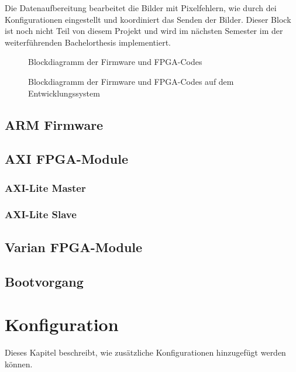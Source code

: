 \documentclass{article}
\begin{document}
Die Datenaufbereitung bearbeitet die Bilder mit Pixelfehlern, wie durch dei Konfigurationen eingestellt und koordiniert das Senden der Bilder. Dieser Block ist noch nicht Teil von diesem Projekt und wird im nächsten Semester im der weiterführenden Bachelorthesis implementiert.

\begin{figure}[tb]
    \caption{Blockdiagramm der Firmware und FPGA-Codes}
    \label{fig:bd_firmware}
\end{figure}


\begin{figure}[tb]
    \caption{Blockdiagramm der Firmware und FPGA-Codes auf dem Entwicklungssystem}
    \label{fig:bd_firmware_pe1}
\end{figure}


\subsection{ARM Firmware}

\subsection{AXI FPGA-Module}
\subsubsection*{AXI-Lite Master}
\subsubsection*{AXI-Lite Slave}


\subsection{Varian FPGA-Module}

\subsection{Bootvorgang}

\section{Konfiguration}
Dieses Kapitel beschreibt, wie zusätzliche Konfigurationen hinzugefügt werden können.
\end{document}
